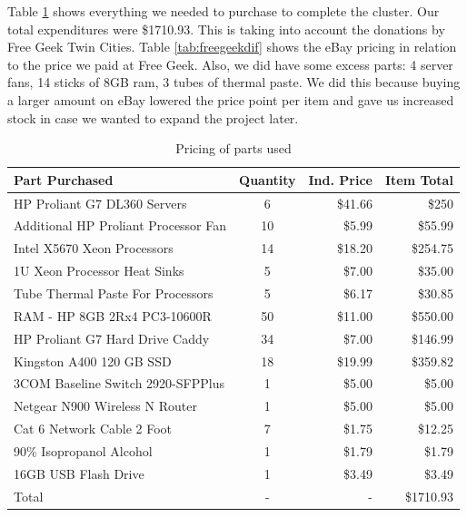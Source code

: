 \documentclass[12pt]{article}
\begin{document}
Table \ref{tab:partlist} shows everything we needed to purchase to complete the cluster. Our total expenditures were \$1710.93. This is taking into account the donations by Free Geek Twin Cities. Table \ref{tab:freegeekdif} shows the eBay pricing in relation to the price we paid at Free Geek. Also, we did have some excess parts: 4 server fans, 14 sticks of 8GB ram, 3 tubes of thermal paste. We did this because buying a larger amount on eBay lowered the price point per item and gave us increased stock in case we wanted to expand the project later.

\begin{table}[ht!]
    \centering
    \begin{tabular}{lcrr}
        Part Purchased &  Quantity &  Ind. Price & Item Total\\
        \hline
        HP Proliant G7 DL360 Servers & 6 & \$41.66 & \$250\\
        Additional HP Proliant Processor Fan & 10 & \$5.99 & \$55.99\\
        Intel X5670 Xeon Processors & 14 & \$18.20 & \$254.75\\
        1U Xeon Processor Heat Sinks & 5 & \$7.00 & \$35.00\\
        Tube Thermal Paste For Processors &	5 &	\$6.17 & \$30.85\\
        RAM - HP 8GB 2Rx4 PC3-10600R &	50 & \$11.00 & \$550.00\\
        HP Proliant G7 Hard Drive Caddy & 34 & \$7.00 &	\$146.99\\
        Kingston A400 120 GB SSD & 18 & \$19.99 & \$359.82\\
        3COM Baseline Switch 2920-SFPPlus & 1 & \$5.00 & \$5.00\\
        Netgear N900 Wireless N Router & 1 & \$5.00 & \$5.00\\
        Cat 6 Network Cable 2 Foot & 7 & \$1.75 & \$12.25\\
        90\% Isopropanol Alcohol & 1 & \$1.79 & \$1.79\\
        16GB USB Flash Drive & 1 & \$3.49 & \$3.49\\
        \hline
        Total & - & - & \$1710.93\\
    \end{tabular}
    \caption{Pricing of parts used}
    \label{tab:partlist}
\end{table}
\end{document}
